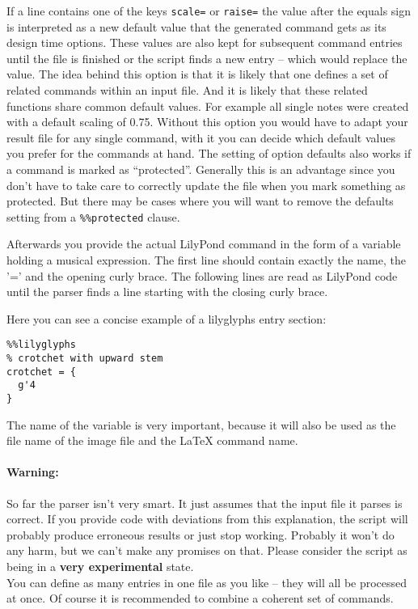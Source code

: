 \documentclass{OLLbook}
\begin{document}
If a line contains one of the keys \verb|scale=| or \verb|raise=| the value after the equals sign is interpreted as a new default value that the generated command gets as its design time options.
These values are also kept for subsequent command entries until the file is finished or the script finds a new entry -- which would replace the value.
The idea behind this option is that it is likely that one defines a set of related commands within an input file.
And it is likely that these related functions share common default values.
For example all single notes were created with a default scaling of 0.75.
Without this option you would have to adapt your result file for any single command, with it you can decide which default values you prefer for the commands at hand. 
The setting of option defaults also works if a command is marked as “protected”.
Generally this is an advantage since you don't have to take care to correctly update the file when you mark something as protected.
But there may be cases where you will want to remove the defaults setting from a \texttt{\%\%protected} clause.

Afterwards you provide the actual LilyPond command in the form of a variable holding a musical expression.
The first line should contain exactly the name, the '=' and the opening curly brace.
The following lines are read as LilyPond code until the parser finds a line starting with the closing curly brace.

Here you can see a concise example of a lilyglyphs entry section:

\begin{verbatim}
%%lilyglyphs
% crotchet with upward stem
crotchet = {
  g'4
}
\end{verbatim}
The name of the variable is very important, because it will also be used as the file name of the image file and the \LaTeX{} command name.

\paragraph*{Warning:}
So far the parser isn't very smart.
It just assumes that the input file it parses is correct.
If you provide code with deviations from this explanation, the script will probably produce erroneous results or just stop working.
Probably it won't do any harm, but we can't make any promises on that.
Please consider the script as being in a \textbf{very experimental} state.\\


You can define as many entries in one file as you like -- they will all be processed at once. 
Of course it is recommended to combine a coherent set of commands.
\end{document}
